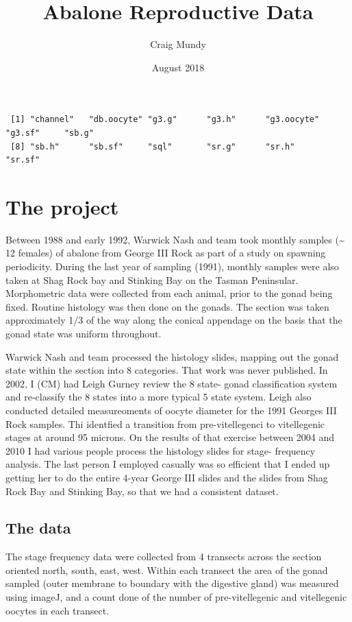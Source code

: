 \documentclass[]{article}
\title{Abalone Reproductive Data}
\author{Craig Mundy}
\date{August 2018}
\begin{document}
\maketitle

\begin{verbatim}
 [1] "channel"   "db.oocyte" "g3.g"      "g3.h"      "g3.oocyte" "g3.sf"     "sb.g"     
 [8] "sb.h"      "sb.sf"     "sql"       "sr.g"      "sr.h"      "sr.sf"    
\end{verbatim}

\hypertarget{the-project}{%
\section{The project}\label{the-project}}

Between 1988 and early 1992, Warwick Nash and team took monthly samples
(\textasciitilde{} 12 females) of abalone from George III Rock as part
of a study on spawning periodicity. During the last year of sampling
(1991), monthly samples were also taken at Shag Rock bay and Stinking
Bay on the Tasman Peninsular. Morphometric data were collected from each
animal, prior to the gonad being fixed. Routine histology was then done
on the gonads. The section was taken approximately 1/3 of the way along
the conical appendage on the basis that the gonad state was uniform
throughout.

Warwick Nash and team processed the histology slides, mapping out the
gonad state within the section into 8 categories. That work was never
published. In 2002, I (CM) had Leigh Gurney review the 8 state- gonad
classification system and re-classify the 8 states into a more typical 5
state system. Leigh also conducted detailed measureoments of oocyte
diameter for the 1991 Georges III Rock samples. Thi identfied a
transition from pre-vitellegenci to vitellegenic stages at around 95
microns. On the results of that exercise between 2004 and 2010 I had
various people process the histology slides for stage- frequency
analysis. The last person I employed casually was so efficient that I
ended up getting her to do the entire 4-year George III slides and the
slides from Shag Rock Bay and Stinking Bay, so that we had a consistent
dataset.

\hypertarget{the-data}{%
\subsection{The data}\label{the-data}}

The stage frequency data were collected from 4 transects across the
section oriented north, south, east, west. Within each transect the area
of the gonad sampled (outer membrane to boundary with the digestive
gland) was measured using imageJ, and a count done of the number of
pre-vitellegenic and vitellegenic oocytes in each transect.
\end{document}
